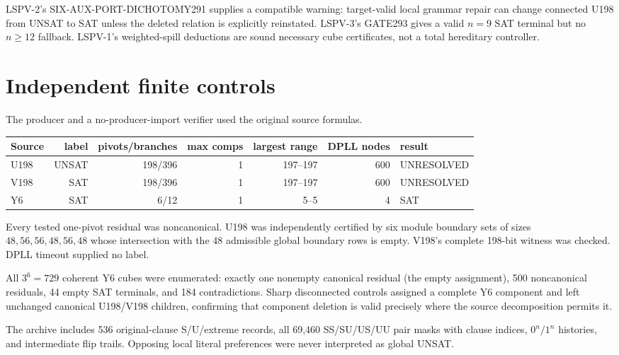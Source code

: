\documentclass[11pt]{article}
\begin{document}
LSPV-2's SIX-AUX-PORT-DICHOTOMY291 supplies a compatible warning: target-valid local grammar repair can change connected U198 from UNSAT to SAT unless the deleted relation is explicitly reinstated.  LSPV-3's GATE293 gives a valid $n=9$ SAT terminal but no $n\ge12$ fallback.  LSPV-1's weighted-spill deductions are sound necessary cube certificates, not a total hereditary controller.

\section{Independent finite controls}
The producer and a no-producer-import verifier used the original source formulas.
\begin{center}
\begin{tabular}{lrrrrrl}
\toprule
Source & label & pivots/branches & max comps & largest range & DPLL nodes & result\\
\midrule
U198 & UNSAT & 198/396 & 1 & 197--197 & 600 & UNRESOLVED\\
V198 & SAT   & 198/396 & 1 & 197--197 & 600 & UNRESOLVED\\
Y6   & SAT   & 6/12    & 1 & 5--5     & 4   & SAT\\
\bottomrule
\end{tabular}
\end{center}
Every tested one-pivot residual was noncanonical.  U198 was independently certified by six module boundary sets of sizes $48,56,56,48,56,48$ whose intersection with the 48 admissible global boundary rows is empty.  V198's complete 198-bit witness was checked.  DPLL timeout supplied no label.

All $3^6=729$ coherent Y6 cubes were enumerated: exactly one nonempty canonical residual (the empty assignment), 500 noncanonical residuals, 44 empty SAT terminals, and 184 contradictions.  Sharp disconnected controls assigned a complete Y6 component and left unchanged canonical U198/V198 children, confirming that component deletion is valid precisely where the source decomposition permits it.

The archive includes 536 original-clause S/U/extreme records, all 69,460 SS/SU/US/UU pair masks with clause indices, $0^n/1^n$ histories, and intermediate flip trails.  Opposing local literal preferences were never interpreted as global UNSAT.
\end{document}

